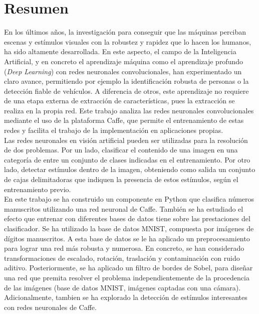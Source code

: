 \chapter*{Resumen}

En los últimos años, la investigación para conseguir que las máquinas perciban escenas y estímulos visuales con la robustez y rapidez que lo hacen los humanos, ha sido altamente desarrollada. En este aspecto, el campo de la Inteligencia Artificial, y en concreto el aprendizaje máquina como el aprendizaje profundo (\textit{Deep Learning}) con redes neuronales convolucionales, han experimentado un claro avance, permitiendo por ejemplo la identificación robusta de personas o la detección fiable de vehículos. A diferencia de otros, este aprendizaje no requiere de una etapa externa de extracción de características, pues la extracción se realiza en la propia red. Este trabajo analiza las redes neuronales convolucionales mediante el uso de la plataforma Caffe, que permite el entrenamiento de estas redes y facilita el trabajo de la implementación en aplicaciones propias.\\

Las redes neuronales en visión artificial pueden ser utilizadas para la resolución de dos problemas. Por un lado, clasificar el contenido de una imagen en una categoría de entre un conjunto de clases indicadas en el entrenamiento. Por otro lado, detectar estímulos dentro de la imagen, obteniendo como salida un conjunto de cajas delimitadoras que indiquen la presencia de estos estímulos, según el entrenamiento previo.\\

En este trabajo se ha construido un componente en Python que clasifica números manuscritos utilizando una red neuronal de Caffe. También se ha estudiado el efecto que entrenar con diferentes bases de datos tiene sobre las prestaciones del clasificador. Se ha utilizado la base de datos MNIST, compuesta por imágenes de dígitos manuscritos. A esta base de datos se le ha aplicado un preprocesamiento para lograr una red más robusta y numerosa. En concreto, se han considerado transformaciones de escalado, rotación, traslación y contaminación con ruido aditivo. Posteriormente, se ha aplicado un filtro de bordes de Sobel, para diseñar una red que premita resolver el problema independientemente de la procedencia de las imágenes (base de datos MNIST, imágenes captadas con una cámara). Adicionalmente, tambien se ha explorado la detección de estímulos interesantes con redes neuronales de Caffe.